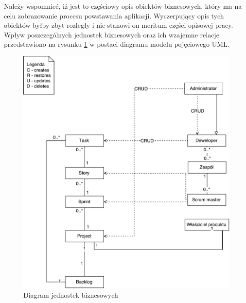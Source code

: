 Należy wspomnieć, iż jest to częściowy opis obiektów biznesowych, który ma na celu zobrazowanie procesu powstawania aplikacji. Wyczerpujący opis tych obiektów byłby zbyt rozległy i nie stanowi on meritum części opisowej pracy. Wpływ poszczególnych jednostek biznesowych oraz ich wzajemne relacje przedstawiono na rysunku \ref{fig:diaguml} w postaci diagramu modelu  pojęciowego UML.
\begin{figure}[h!]
	\centering
	\includegraphics[width=15cm]{rysunki/diaguml.pdf}	
	\caption{Diagram jednostek biznesowych}
	\label{fig:diaguml}
\end{figure}

